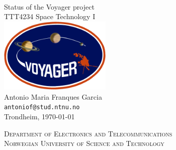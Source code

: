 \begin{titlepage}
\begin{center}

~\\[3cm]
{\Huge Status of the Voyager project}\\[1cm]

{\large TTT4234 Space Technology I}\\[1.5cm]

\includegraphics[width=0.4\textwidth]{./voyagerlogo}~\\[1.5cm]


{\large Antonio Maria Franques Garcia\\ \texttt{antoniof@stud.ntnu.no}}\\[1cm]
{\large Trondheim, \today}


\vfill

\textsc{\large Department of Electronics and Telecommunications} \\
\textsc{\large Norwegian University of Science and Technology}

\end{center}
\end{titlepage}